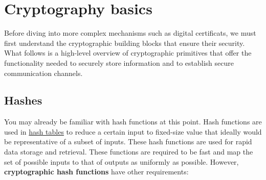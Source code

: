 \section{Cryptography basics}

Before diving into more complex mechanisms such as digital certificats, we must
first understand the cryptographic building blocks that ensure their security.
What follows is a high-level overview of cryptographic primitives that offer
the functionality needed to securely store information and to establish
secure communication channels.

\subsection{Hashes}

You may already be familiar with hash functions at this point. Hash functions
are used in \href{https://en.cppreference.com/w/cpp/container/unordered_map.html}
{hash tables} to reduce a certain input to fixed-size value that ideally would
be representative of a subset of inputs. These hash functions are used for
rapid data storage and retrieval. These functions are required to be fast
and map the set of possible inputs to that of outputs as uniformly as possible.
However, \textbf{cryptographic hash functions} have other requirements:

